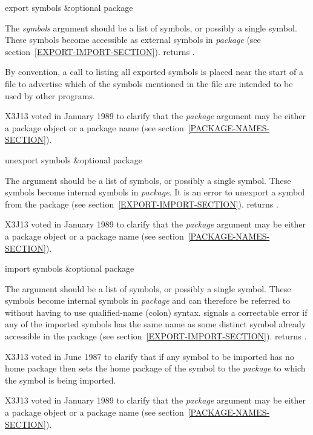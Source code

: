 \begin{defun}[Function]
export symbols &optional package

The \emph{symbols} argument should be a list of symbols, or possibly a single
symbol.  These symbols become accessible as external symbols in
\emph{package} (see section~\ref{EXPORT-IMPORT-SECTION}).
 returns {\true}.

By convention, a call to  listing all exported symbols is
placed near the start of a file to advertise which of the symbols
mentioned in the file are intended to be used by other programs.

\begin{new}
X3J13 voted in January 1989
to clarify that the \emph{package} argument may be either a package object
or a package name (see section~\ref{PACKAGE-NAMES-SECTION}).
\end{new}
\end{defun}

\begin{defun}[Function]
unexport symbols &optional package

The argument should be a list of symbols, or possibly a single symbol.
These symbols become internal symbols in \emph{package}.
It is an error to unexport a symbol from the  package
(see section~\ref{EXPORT-IMPORT-SECTION}).
 returns {\true}.

\begin{new}
X3J13 voted in January 1989
to clarify that the \emph{package} argument may be either a package object
or a package name (see section~\ref{PACKAGE-NAMES-SECTION}).
\end{new}
\end{defun}

\begin{defun}[Function]
import symbols &optional package

The argument should be a list of symbols, or possibly a single symbol.
These symbols become internal symbols in \emph{package} and can therefore
be referred to without having to use qualified-name (colon) syntax.
 signals a
correctable error if any of the imported symbols has the same name as
some distinct symbol already accessible in the package
(see section~\ref{EXPORT-IMPORT-SECTION}).
 returns {\true}.

\begin{newer}
X3J13 voted in June 1987 
to clarify that if any symbol to be imported has no home package
then  sets the home package of the symbol to the
\emph{package} to which the symbol is being imported.
\end{newer}

\begin{new}
X3J13 voted in January 1989
to clarify that the \emph{package} argument may be either a package object
or a package name (see section~\ref{PACKAGE-NAMES-SECTION}).
\end{new}
\end{defun}

